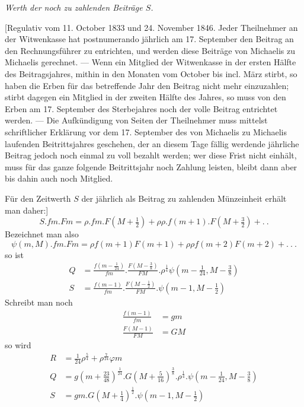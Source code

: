 \begin{center}\textit{Werth der noch zu zahlenden Beiträge \(S\).}\end{center}
\noindent\hspace*{1.2em} [Regulativ vom 11. October 1833 und 24. November 1846. Jeder Theilnehmer an der Witwenkasse hat postnumerando jährlich am 17. September den Beitrag an den Rechnungsführer zu entrichten, und werden diese Beiträge von Michaelis zu Michaelis gerechnet. — Wenn ein Mitglied der Witwenkasse in der ersten Hälfte des Beitragsjahres, mithin in den Monaten vom October bis incl. März stirbt, so haben die Erben für das betreffende Jahr den Beitrag nicht mehr einzuzahlen; stirbt dagegen ein Mitglied in der zweiten Hälfte des Jahres, so muss von den Erben am 17. September des Sterbejahres noch der volle Beitrag entrichtet werden. — Die Aufkündigung von Seiten der Theilnehmer muss mittelst schriftlicher Erklärung vor dem 17. September des von Michaelis zu Michaelis laufenden Beitrittsjahres geschehen, der an diesem Tage fällig werdende jährliche Beitrag jedoch noch einmal zu voll bezahlt werden; wer diese Frist nicht einhält, muss für das ganze folgende Beitrittsjahr noch Zahlung leisten, bleibt dann aber bis dahin auch noch Mitglied.

Für den Zeitwerth \(S\) der jährlich als Beitrag zu zahlenden Münzeinheit erhält man daher:]
\[
S\mathord{.}fm\mathord{.}Fm=\rho\mathord{.}fm\mathord{.}F(M+\tfrac{1}{2})+\rho\rho\mathord{.}f(m+1)\mathord{.}F(M+\tfrac{3}{2})+.\ .
\]
\noindent Bezeichnet man also
\[
\psi(m,M)\mathord{.}fm\mathord{.}Fm=\rho f(m+1)F(m+1)+\rho\rho f(m+2)F(m+2)+.\ .\ .
\]
\noindent so ist
\[
\begin{aligned}
Q&=\frac{f(m-\tfrac{1}{24})}{fm}\mathord{.}\frac{F(M-\tfrac{3}{8})}{FM}\mathord{.}\rho^{\frac{1}{4}}\psi(m-\tfrac{1}{24},M-\tfrac{3}{8})\\[5pt]
S&=\frac{f(m-1)}{fm}\mathord{.}\frac{F(M-\tfrac{1}{2})}{FM}\mathord{.}\psi(m-1,M-\tfrac{1}{2})
\end{aligned}
\]
\noindent Schreibt man noch
\[
\begin{aligned}
\frac{f(m-1)}{fm}&=gm\\[5pt]
\frac{F(M-1)}{FM}&=GM
\end{aligned}
\]
\noindent so wird
\[
\begin{aligned}
R&=\tfrac{1}{24}\rho^{\frac{5}{4}}+\rho^{\frac{7}{24}}\varphi m\\
Q&=g(m+\tfrac{23}{48})^{\frac{1}{24}}\mathord{.}G(M+\tfrac{5}{16})^{\frac{3}{8}}\mathord{.}\rho^{\frac{1}{4}}\mathord{.}\psi(m-\tfrac{1}{24},M-\tfrac{3}{8})\\
S&=gm\mathord{.}G(M+\tfrac{1}{4})^{\frac{1}{2}}\mathord{.}\psi(m-1,M-\tfrac{1}{2})
\end{aligned}
\]
